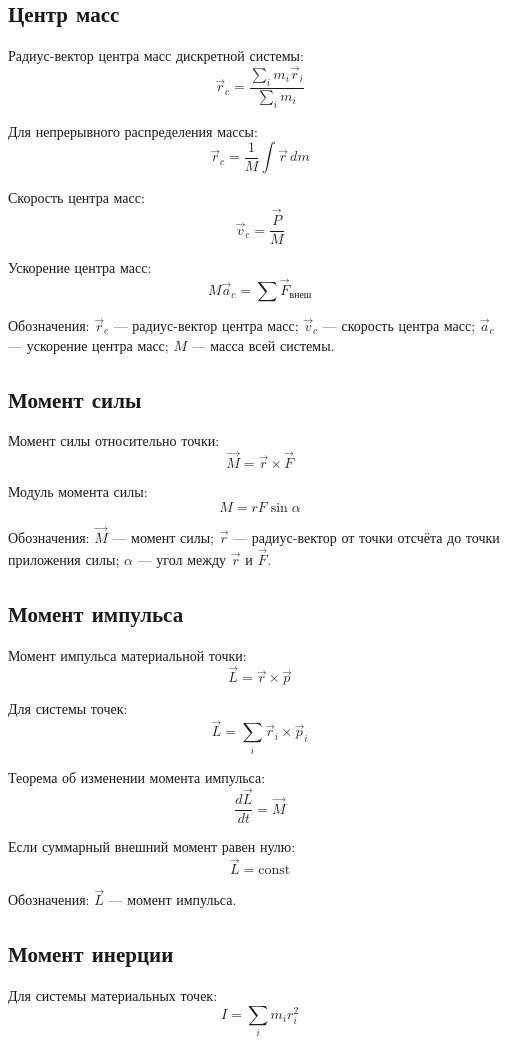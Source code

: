 \documentclass[a4paper,12pt]{article}
\begin{document}
\subsection{Центр масс}

Радиус-вектор центра масс дискретной системы:
\[
\vec r_c = \frac{\sum\limits_i m_i \vec r_i}{\sum\limits_i m_i}
\]

Для непрерывного распределения массы:
\[
\vec r_c = \frac{1}{M} \int \vec r\, dm
\]

Скорость центра масс:
\[
\vec v_c = \frac{\vec P}{M}
\]

Ускорение центра масс:
\[
M \vec a_c = \sum \vec F_{\text{внеш}}
\]

Обозначения:  
\(\vec r_c\) — радиус-вектор центра масс;  
\(\vec v_c\) — скорость центра масс;  
\(\vec a_c\) — ускорение центра масс;  
\(M\) — масса всей системы.

\subsection{Момент силы}

Момент силы относительно точки:
\[
\vec M = \vec r \times \vec F
\]

Модуль момента силы:
\[
M = r F \sin \alpha
\]

Обозначения:  
\(\vec M\) — момент силы;  
\(\vec r\) — радиус-вектор от точки отсчёта до точки приложения силы;  
\(\alpha\) — угол между \(\vec r\) и \(\vec F\).

\subsection{Момент импульса}

Момент импульса материальной точки:
\[
\vec L = \vec r \times \vec p
\]

Для системы точек:
\[
\vec L = \sum\limits_i \vec r_i \times \vec p_i
\]

Теорема об изменении момента импульса:
\[
\frac{d\vec L}{dt} = \vec M
\]

Если суммарный внешний момент равен нулю:
\[
\vec L = \text{const}
\]

Обозначения:  
\(\vec L\) — момент импульса.

\subsection{Момент инерции}

Для системы материальных точек:
\[
I = \sum\limits_i m_i r_i^2
\]
\end{document}
